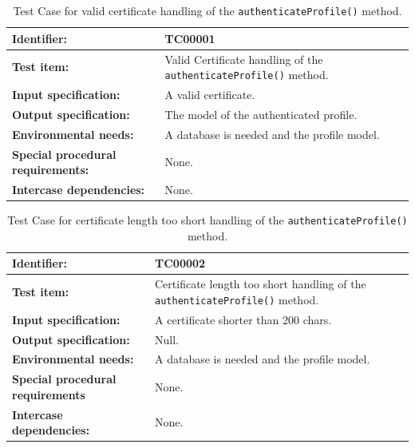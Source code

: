 \begin{table}[H]
	\centering
		\begin{tabular}{| p{4.5cm} | m{9cm} |}
			\hline
			\textbf{Identifier:} 					& TC00001 \\ \hline
			\textbf{Test item:}						& Valid Certificate handling of the \texttt{authenticateProfile()} method. \\ \hline
			\textbf{Input specification:}			& A valid certificate. \\ \hline
			\textbf{Output specification:} 			& The model of the authenticated profile. \\ \hline
			\textbf{Environmental needs:}			& A database is needed and the profile model. \\ \hline
			\textbf{Special procedural requirements:}	& None. \\ \hline
			\textbf{Intercase dependencies:}			& None. \\ \hline
		\end{tabular}
	\caption{Test Case for valid certificate handling of the \texttt{authenticateProfile()} method.}
	\label{tab:TestCase_ValidCertificateHandling}
\end{table}

\begin{table}[H]
	\centering
		\begin{tabular}{| p{4.5cm} | m{9cm} |}
			\hline
			\textbf{Identifier:} 					& TC00002 \\ \hline
			\textbf{Test item:}						& Certificate length too short handling of the \texttt{authenticateProfile()} method. \\ \hline
			\textbf{Input specification:}			& A certificate shorter than 200 chars. \\ \hline
			\textbf{Output specification:} 			& Null. \\ \hline
			\textbf{Environmental needs:}			& A database is needed and the profile model. \\ \hline
			\textbf{Special procedural requirements}	& None. \\ \hline
			\textbf{Intercase dependencies:}			& None. \\ \hline
		\end{tabular}
	\caption{Test Case for certificate length too short handling of the \texttt{authenticateProfile()} method.}
	\label{tab:TestCase_CertificateToShortHandling}
\end{table}

